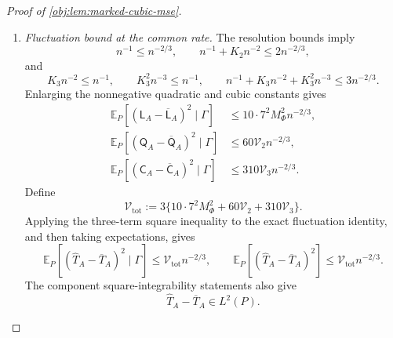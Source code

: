 \documentclass[11pt]{article}
\begin{document}
\begin{proof}[Proof of \cref{obj:lem:marked-cubic-mse}]
\begin{enumerate}
There are exactly \(7^s(2^s-1)\) summands: \(7^s\) coordinate tuples, each with \(2^s-1\) nonempty subsets of evaluation positions. Define
\[
\mathcal V_s
:=
7^{2s}(2^s-1)^2M_\Phi^2
(1+U_{\mathrm{env}})^{2s}(1+V_{\mathrm{bin}})^s,
\qquad s=2,3.
\]
Applying the finite-sum square inequality to the displayed expansions gives
\[
\begin{aligned}
\mathbb E_P[(\mathsf Q_A-\overline{\mathsf Q}_A)^2\mid\Gamma]
&\le\mathcal V_2(n^{-1}+K_2n^{-2}),\\
\mathbb E_P[(\mathsf C_A-\overline{\mathsf C}_A)^2\mid\Gamma]
&\le\mathcal V_3(n^{-1}+K_3n^{-2}+K_3^2n^{-3}).
\end{aligned}
\]

\item \textit{Fluctuation bound at the common rate.}
The resolution bounds imply
\[
n^{-1}\le n^{-2/3},\qquad
n^{-1}+K_2n^{-2}\le2n^{-2/3},
\]
and
\[
K_3n^{-2}\le n^{-1},\qquad
K_3^2n^{-3}\le n^{-1},\qquad
n^{-1}+K_3n^{-2}+K_3^2n^{-3}\le3n^{-2/3}.
\]
Enlarging the nonnegative quadratic and cubic constants gives
\[
\begin{aligned}
\mathbb E_P[(\mathsf L_A-\overline{\mathsf L}_A)^2\mid\Gamma]
&\le10\cdot7^2M_\Phi^2n^{-2/3},\\
\mathbb E_P[(\mathsf Q_A-\overline{\mathsf Q}_A)^2\mid\Gamma]
&\le60\mathcal V_2n^{-2/3},\\
\mathbb E_P[(\mathsf C_A-\overline{\mathsf C}_A)^2\mid\Gamma]
&\le310\mathcal V_3n^{-2/3}.
\end{aligned}
\]
Define
\[
\mathcal V_{\mathrm{tot}}
:=3\{10\cdot7^2M_\Phi^2+60\mathcal V_2+310\mathcal V_3\}.
\]
Applying the three-term square inequality to the exact fluctuation identity, and then taking expectations, gives
\[
\mathbb E_P[(\widehat T_A-\overline T_A)^2\mid\Gamma]
\le\mathcal V_{\mathrm{tot}}n^{-2/3},
\qquad
\mathbb E_P[(\widehat T_A-\overline T_A)^2]
\le\mathcal V_{\mathrm{tot}}n^{-2/3}.
\]
The component square-integrability statements also give
\[
\widehat T_A-\overline T_A\in L^2(P).
\]


\end{enumerate}
\end{proof}
\end{document}
